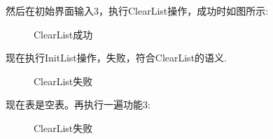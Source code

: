 \documentclass[supercite]{Experimental_Report}
\theoremstyle{definition}
\begin{document}
\noindent
然后在初始界面输入3，执行ClearList操作，成功时如图所示:
\begin{figure}[htbp]
	\centering
	\centering
	\centering
	\caption{ClearList成功}
	\label{fig1-11}
\end{figure}

\clearpage
\noindent
现在执行InitList操作，失败，符合ClearList的语义.
\begin{figure}[htbp]
	\centering
	\centering
	\caption{ClearList失败}
	\label{fig1-12}
\end{figure}

\noindent
现在表是空表。再执行一遍功能3:
\begin{figure}[htbp]
	\centering
	\centering
	\caption{ClearList失败}
	\label{fig1-13}
\end{figure}
\end{document}
